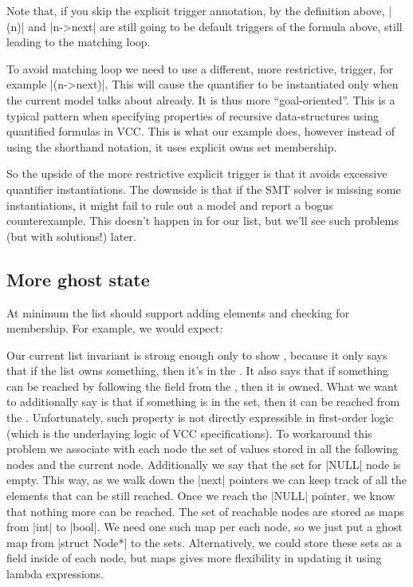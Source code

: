 Note that, if you skip the explicit trigger annotation, by the definition
above, \vcc|{\mine(n)}| and \vcc|{n->next}| are still going to be default
triggers of the formula above, still leading to the matching loop.

To avoid matching loop we need to use a different, more restrictive,
trigger, for example \vcc|{\mine(n->next)}|.
This will cause the quantifier to be instantiated only when the current
model talks about  already.
It is thus more ``goal-oriented''.
This is a typical pattern when specifying properties of recursive data-structures
using quantified formulas in VCC.
This is what our example does, however instead of using the shorthand
notation, it uses explicit owns set membership.

So the upside of the more restrictive explicit trigger is that it avoids
excessive quantifier instantiations.
The downside is that if the SMT solver is missing some instantiations,
it might fail to rule out a model and report a bogus counterexample.
This doesn't happen in for our list, but we'll see such problems
(but with solutions!) later.

\subsection{More ghost state}

At minimum the list should support adding elements and checking
for membership. For example, we would expect:


\noindent
Our current list invariant is strong enough only to show
, because it only says
that if the list owns something, then it's in the .
It also says that if something can be reached by following
the  field from the , then it is owned.
What we want to additionally say is that if something is in the 
set, then it can be reached from the .
Unfortunately, such property is not directly expressible in first-order
logic (which is the underlaying logic of VCC specifications).
To workaround this problem we associate with each node
the set of values stored in all the following nodes and
the current node.
Additionally we say that the set for \vcc|NULL| node is empty.
This way, as we walk down the \vcc|next| pointers we can keep
track of all the elements that can be still reached.
Once we reach the \vcc|NULL| pointer, we know that nothing
more can be reached.
The set of reachable nodes are stored as maps from
\vcc|int| to \vcc|bool|.
We need one such map per each node, so we just
put a ghost map from \vcc|struct Node*| to the sets.
Alternatively, we could store these sets as a field inside of each node,
but maps gives more flexibility in updating it using lambda expressions.


